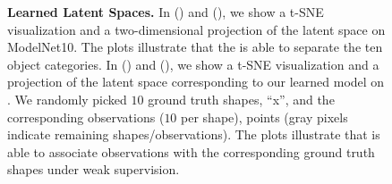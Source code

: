 \begin{figure}[t]
\begin{subfigure}[t]{0.49\linewidth}
        \label{fig:results-latent-space-b2}
    \end{subfigure}
    \vspace*{-\figskipcaption px}
    \caption{{\bf Learned Latent Spaces.} In () and (), we show a t-SNE \citep{Maaten2008JMLR} visualization and a two-dimensional projection of the \DVAE latent space on ModelNet10. The plots illustrate that the \DVAE is able to separate the ten object categories. In () and (), we show a t-SNE visualization and a projection of the latent space corresponding to our learned \AML model on \clean. We randomly picked $10$ ground truth shapes,  ``x'', and the corresponding observations ($10$ per shape), points (gray pixels indicate remaining shapes/observations). The plots illustrate that \AML is able to associate observations with the corresponding ground truth shapes under weak supervision.}
    \label{fig:results-latent-space}
    \vspace*{-\figskipbelow px}
\end{figure}